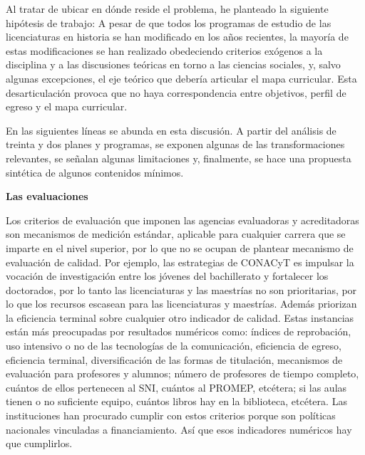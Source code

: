 Al tratar de ubicar en dónde reside el problema, he planteado la 
siguiente hipótesis de trabajo: A pesar de que todos los programas de 
estudio de las licenciaturas en historia se han modificado en los años 
recientes, la mayoría de estas modificaciones se han realizado 
obedeciendo criterios exógenos a la disciplina y a las discusiones 
teóricas en torno a las ciencias sociales, y, salvo algunas excepciones, el eje 
teórico que debería articular el mapa curricular. Esta desarticulación 
provoca que no haya correspondencia entre objetivos, perfil de egreso y 
el mapa curricular. 

En las siguientes líneas se abunda en esta discusión. A partir del 
análisis de treinta y dos planes y programas, se exponen algunas de las 
transformaciones relevantes, se señalan algunas limitaciones y, 
finalmente, se hace una propuesta sintética de algunos contenidos 
mínimos. 

\medskip
\textbf{Las evaluaciones}
\enlargethispage{1\baselineskip}

Los criterios de evaluación que imponen las agencias evaluadoras y 
acreditadoras son mecanismos de medición estándar, aplicable para 
cualquier carrera que se imparte en el nivel superior, por lo que no se 
ocupan de plantear mecanismo de evaluación de calidad. Por ejemplo, las 
estrategias de CONACyT es impulsar la vocación de investigación entre 
los jóvenes del bachillerato y fortalecer los doctorados, por lo tanto 
las licenciaturas y las maestrías no son prioritarias, por lo que los 
recursos escasean para las licenciaturas y maestrías. Además priorizan 
la eficiencia terminal sobre cualquier otro indicador de calidad. Estas 
instancias están más preocupadas por resultados numéricos como: índices 
de reprobación, uso intensivo o no de las tecnologías de la 
comunicación,  eficiencia de egreso, eficiencia terminal, 
diversificación de las formas de titulación, mecanismos de evaluación 
para profesores y alumnos; número de profesores de tiempo completo, 
cuántos de ellos pertenecen al SNI, cuántos al PROMEP, etcétera; si las 
aulas tienen o no suficiente equipo, cuántos libros hay en la 
biblioteca, etcétera. Las instituciones han procurado cumplir con estos 
criterios porque son políticas nacionales vinculadas a financiamiento. 
Así que esos indicadores numéricos hay que cumplirlos.


